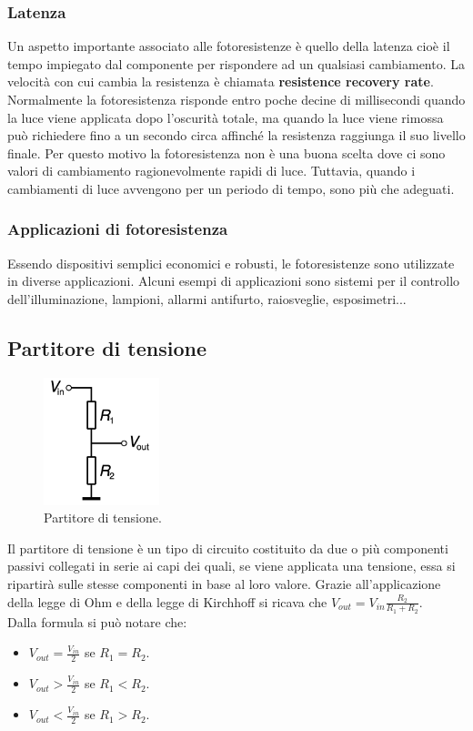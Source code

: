 \documentclass[12pt,oneside,a4paper]{article}
\begin{document}
\subsubsection{Latenza}
Un aspetto importante associato alle fotoresistenze è quello della latenza cioè il tempo impiegato dal componente per rispondere ad un qualsiasi cambiamento. La velocità con cui cambia la resistenza è chiamata \textbf{resistence recovery rate}.
\\ Normalmente la fotoresistenza risponde entro poche decine di millisecondi quando la luce viene applicata dopo l'oscurità totale, ma quando la luce viene rimossa può richiedere fino a un secondo circa affinché la resistenza raggiunga il suo livello finale. Per questo motivo la fotoresistenza non è una buona scelta dove ci sono valori di cambiamento ragionevolmente rapidi di luce. Tuttavia, quando i cambiamenti di luce avvengono per un periodo di tempo, sono più che adeguati.


\subsubsection{Applicazioni di fotoresistenza}
Essendo dispositivi semplici economici e robusti, le fotoresistenze sono utilizzate in diverse applicazioni. Alcuni esempi di applicazioni sono sistemi per il controllo dell'illuminazione, lampioni, allarmi antifurto, raiosveglie,  esposimetri...


\subsection{Partitore di tensione}
\begin{figure}[ht!]
    \centering
    \includegraphics[width=0.3\textwidth]{figures/partitore_tensione.png}
    \caption{Partitore di tensione.}
\end{figure}
Il partitore di tensione\cite{VoltageDivider} è un tipo di circuito costituito da due o più componenti passivi collegati in serie ai capi dei quali, se viene applicata una tensione, essa si ripartirà sulle stesse componenti in base al loro valore.
Grazie all'applicazione della legge di Ohm e della legge di Kirchhoff si ricava che $V_{out} = V_{in} \frac{R_2}{R_1 + R_2}$.
\\Dalla formula si può notare che:
\begin{itemize}
    \item $V_{out} = \frac{V_{in}}{2}$ se $R_1 = R_2$.
    \item $V_{out} > \frac{V_{in}}{2}$ se $R_1 < R_2$.
    \item $V_{out} < \frac{V_{in}}{2}$ se $R_1 > R_2$.
\end{itemize}
\end{document}
